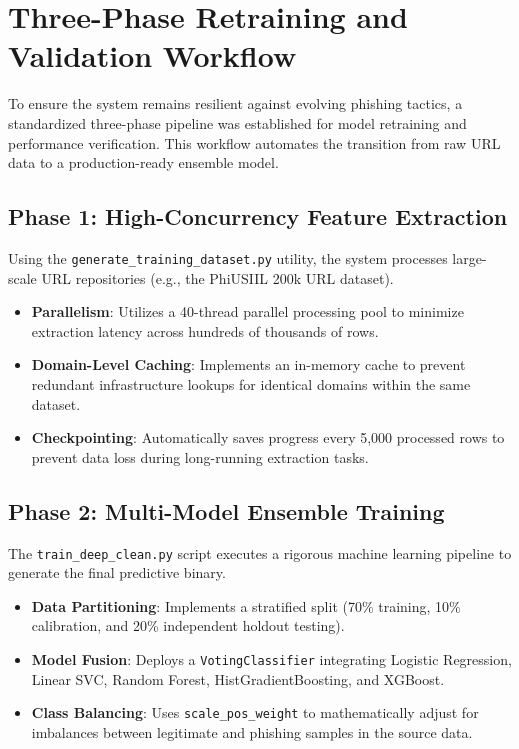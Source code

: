 \section{Three-Phase Retraining and Validation Workflow}
To ensure the system remains resilient against evolving phishing tactics, a standardized three-phase pipeline was established for model retraining and performance verification. This workflow automates the transition from raw URL data to a production-ready ensemble model.

\subsection*{Phase 1: High-Concurrency Feature Extraction}
\noindent
Using the \texttt{generate\_training\_dataset.py} utility, the system processes large-scale URL repositories (e.g., the PhiUSIIL 200k URL dataset). 
\begin{itemize}
    \item \textbf{Parallelism}: Utilizes a 40-thread parallel processing pool to minimize extraction latency across hundreds of thousands of rows.
    \item \textbf{Domain-Level Caching}: Implements an in-memory cache to prevent redundant infrastructure lookups for identical domains within the same dataset.
    \item \textbf{Checkpointing}: Automatically saves progress every 5,000 processed rows to prevent data loss during long-running extraction tasks.
\end{itemize}

\subsection*{Phase 2: Multi-Model Ensemble Training}
\noindent
The \texttt{train\_deep\_clean.py} script executes a rigorous machine learning pipeline to generate the final predictive binary.
\begin{itemize}
    \item \textbf{Data Partitioning}: Implements a stratified split (70\% training, 10\% calibration, and 20\% independent holdout testing).
    \item \textbf{Model Fusion}: Deploys a \texttt{VotingClassifier} integrating Logistic Regression, Linear SVC, Random Forest, HistGradientBoosting, and XGBoost.
    \item \textbf{Class Balancing}: Uses \texttt{scale\_pos\_weight} to mathematically adjust for imbalances between legitimate and phishing samples in the source data.
\end{itemize}

